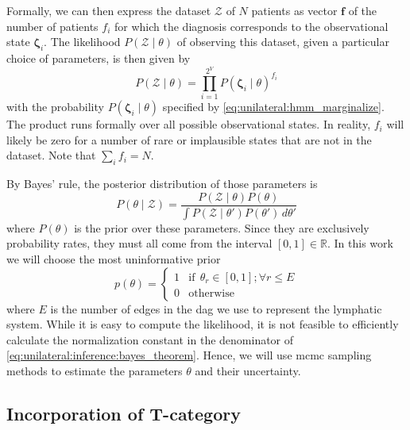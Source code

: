 \documentclass[\relativeRoot/main.tex]{subfiles}
\begin{document}
Formally, we can then express the dataset $\boldsymbol{\mathcal{Z}}$ of $N$ patients as vector $\mathbf{f}$ of the number of patients $f_i$ for which the diagnosis corresponds to the observational state $\boldsymbol{\zeta}_i$. The likelihood $P \left( \boldsymbol{\mathcal{Z}} \mid \theta \right)$ of observing this dataset, given a particular choice of parameters, is then given by
%
\begin{equation} \label{eq:unilateral:llh_as_prod}
    P \left( \boldsymbol{\mathcal{Z}} \mid \theta \right) = \prod_{i=1}^{2^V}{P \left( \boldsymbol{\zeta}_i \mid \theta \right)^{f_i}}
\end{equation}
%
with the probability $P \left( \boldsymbol{\zeta}_i \mid \theta \right)$ specified by \cref{eq:unilateral:hmm_marginalize}. The product runs formally over all possible observational states. In reality, $f_i$ will likely be zero for a number of rare or implausible states that are not in the dataset. Note that $\sum_{i}{f_i} = N$.

By Bayes' rule, the posterior distribution of those parameters is 
%
\begin{equation} \label{eq:unilateral:inference:bayes_theorem}
    P \left( \theta \mid \boldsymbol{\mathcal{Z}} \right) = \frac{P \left( \boldsymbol{\mathcal{Z}} \mid \theta \right) P\left( \theta \right)}{\int{P \left( \boldsymbol{\mathcal{Z}} \mid \theta' \right) P \left( \theta' \right) \,d\theta'}}
\end{equation}
%
where $P(\theta)$ is the prior over these parameters. Since they are exclusively probability rates, they must all come from the interval $[0,1] \in \mathbb{R}$. In this work we will choose the most uninformative prior
%
\begin{equation}
    p(\theta) = 
    \begin{cases}
        1 & \text{if} \ \ \theta_r \in \left[ 0,1 \right]; \forall r \leq E \\
        0 & \text{otherwise}
    \end{cases}
\end{equation}
%
where $E$ is the number of edges in the \gls{dag} we use to represent the lymphatic system. While it is easy to compute the likelihood, it is not feasible to efficiently calculate the normalization constant in the denominator of \cref{eq:unilateral:inference:bayes_theorem}. Hence, we will use \gls{mcmc} sampling methods to estimate the parameters $\theta$ and their uncertainty.

\subsection{Incorporation of T-category}
\label{subsec:unilateral:formalism:tstage}
\end{document}
